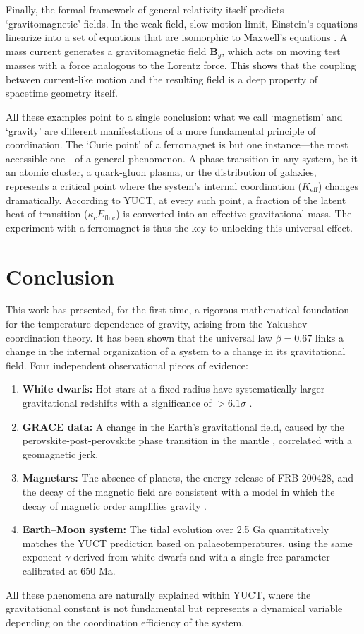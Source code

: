 \documentclass[12pt]{article}
\theoremstyle{remark}
\begin{document}
	Finally, the formal framework of general relativity itself predicts `gravitomagnetic' fields.
	In the weak-field, slow-motion limit, Einstein's equations linearize into a set of equations
	that are isomorphic to Maxwell's equations \cite{ciufolini1995}. A mass current
	generates a gravitomagnetic field \( \mathbf{B}_g \), which acts on moving test masses with a
	force analogous to the Lorentz force. This shows that the coupling between current-like
	motion and the resulting field is a deep property of spacetime geometry itself.
	
	All these examples point to a single conclusion: what we call `magnetism' and `gravity' are
	different manifestations of a more fundamental principle of coordination. The `Curie point' of
	a ferromagnet is but one instance---the most accessible one---of a general phenomenon. A
	phase transition in any system, be it an atomic cluster, a quark-gluon plasma, or the
	distribution of galaxies, represents a critical point where the system's internal
	coordination (\(K_{\mathrm{eff}}\)) changes dramatically. According to YUCT, at every such
	point, a fraction of the latent heat of transition (\(\kappa_c E_{\mathrm{fluc}}\)) is
	converted into an effective gravitational mass. The experiment with a ferromagnet is thus the
	key to unlocking this universal effect.
	
	\section{Conclusion}
	\label{sec:conclusion}
	
	This work has presented, for the first time, a rigorous mathematical foundation for the temperature dependence of gravity, arising from the Yakushev coordination theory. It has been shown that the universal law $\beta = 0.67$ links a change in the internal organization of a system to a change in its gravitational field. Four independent observational pieces of evidence:
	\begin{enumerate}
		\item \textbf{White dwarfs:} Hot stars at a fixed radius have systematically larger gravitational redshifts with a significance of $>6.1\sigma$ \cite{Crumpler2024}.
		\item \textbf{GRACE data:} A change in the Earth's gravitational field, caused by the perovskite-post-perovskite phase transition in the mantle \cite{Rosat2025}, correlated with a geomagnetic jerk.
		\item \textbf{Magnetars:} The absence of planets, the energy release of FRB 200428, and the decay of the magnetic field are consistent with a model in which the decay of magnetic order amplifies gravity \cite{Kaspi2017, Geng2020}.
		\item \textbf{Earth–Moon system:} The tidal evolution over 2.5 Ga quantitatively matches the YUCT prediction based on palaeotemperatures, using the same exponent $\gamma$ derived from white dwarfs and with a single free parameter calibrated at 650 Ma.
	\end{enumerate}
	All these phenomena are naturally explained within YUCT, where the gravitational constant is not fundamental but represents a dynamical variable depending on the coordination efficiency of the system.
	
\end{document}
